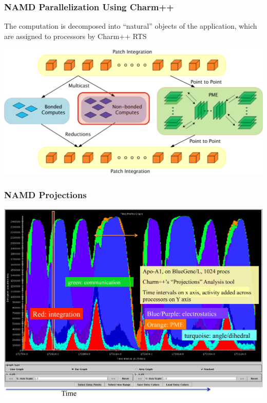 \begin{frame}[t]
\frametitle{NAMD Parallelization Using Charm++}
The computation is decomposed into ``natural'' objects of the application, which
are assigned to processors by Charm++ RTS
  \begin{center} \includegraphics[width=\textwidth]{figures/md_parallelize.pdf} \end{center}
\end{frame}

\begin{frame}[t]
\frametitle{NAMD Projections}
  \begin{center} \includegraphics[width=.9\textwidth]{figures/namd_projection.pdf} \end{center}
\end{frame}

